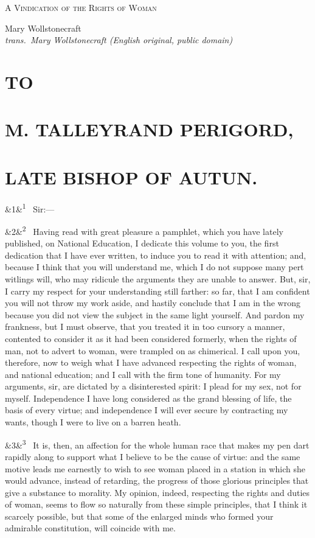 \documentclass[12pt]{article}
\newcommand{\work}[1]{\begin{center}\LARGE\scshape #1\end{center}}
\newcommand{\attrib}[2]{\begin{center}\large #1\\[2pt]\small\itshape trans.\ #2\end{center}\vspace{1em}}
\newcommand{\para}[1][]{\par\noindent\ifx&#1&\else\textsuperscript{\footnotesize #1}~\fi}
\begin{document}
\work{A Vindication of the Rights of Woman}
\attrib{Mary Wollstonecraft}{Mary Wollstonecraft (English original, public domain)}

\section*{TO}

\section*{M. TALLEYRAND PERIGORD,}

\section*{LATE BISHOP OF AUTUN.}

\para[1] Sir:---

\para[2] Having read with great pleasure a pamphlet, which you have lately published, on National Education, I dedicate this volume to you, the first dedication that I have ever written, to induce you to read it with attention; and, because I think that you will understand me, which I do not suppose many pert witlings will, who may ridicule the arguments they are unable to answer. But, sir, I carry my respect for your understanding still farther: so far, that I am confident you will not throw my work aside, and hastily conclude that I am in the wrong because you did not view the subject in the same light yourself. And pardon my frankness, but I must observe, that you treated it in too cursory a manner, contented to consider it as it had been considered formerly, when the rights of man, not to advert to woman, were trampled on as chimerical. I call upon you, therefore, now to weigh what I have advanced respecting the rights of woman, and national education; and I call with the firm tone of humanity. For my arguments, sir, are dictated by a disinterested spirit: I plead for my sex, not for myself. Independence I have long considered as the grand blessing of life, the basis of every virtue; and independence I will ever secure by contracting my wants, though I were to live on a barren heath.

\para[3] It is, then, an affection for the whole human race that makes my pen dart rapidly along to support what I believe to be the cause of virtue: and the same motive leads me earnestly to wish to see woman placed in a station in which she would advance, instead of retarding, the progress of those glorious principles that give a substance to morality. My opinion, indeed, respecting the rights and duties of woman, seems to flow so naturally from these simple principles, that I think it scarcely possible, but that some of the enlarged minds who formed your admirable constitution, will coincide with me.
\end{document}

